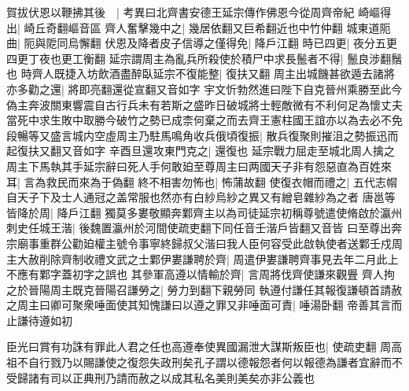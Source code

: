 賀拔伏恩以鞭拂其後　|{
	考異曰北齊書安德王延宗傳作佛恩今從周齊帝紀}
崎嶇得出|{
	崎丘奇翻嶇音區}
齊人奮擊幾中之|{
	幾居依翻又巨希翻近也中竹仲翻}
城東道阨曲|{
	阨與阸同烏懈翻}
伏恩及降者皮子信導之僅得免|{
	降戶江翻}
時已四更|{
	夜分五更四更丁夜也更工衡翻}
延宗謂周主為亂兵所殺使於積尸中求長鬛者不得|{
	鬛良涉翻鬚也}
時齊人既捷入坊飲酒盡醉臥延宗不復能整|{
	復扶又翻}
周主出城饑甚欲遁去諸將亦多勸之還|{
	將即亮翻還從宣翻又音如字}
宇文忻勃然進曰陛下自克晉州乘勝至此今偽主奔波關東響震自古行兵未有若斯之盛昨日破城將士輕敵微有不利何足為懷丈夫當死中求生敗中取勝今破竹之勢已成柰何棄之而去齊王憲柱國王誼亦以為去必不免段暢等又盛言城内空虛周主乃駐馬鳴角收兵俄頃復振|{
	散兵復聚則摧沮之勢振迅而起復扶又翻又音如字}
辛酉旦還攻東門克之|{
	還復也}
延宗戰力屈走至城北周人擒之周主下馬執其手延宗辭曰死人手何敢廹至尊周主曰两國天子非有怨惡直為百姓來耳|{
	言為救民而來為于偽翻}
終不相害勿怖也|{
	怖蒲故翻}
使復衣帽而禮之|{
	五代志㡌自天子下及士人通冠之盖常服也然亦有白紗烏紗之異又有繒皂雜紗為之者}
唐邕等皆降於周|{
	降戶江翻}
獨莫多婁敬顯奔鄴齊主以為司徒延宗初稱尊號遣使脩啟於瀛州刺史任城王湝|{
	後魏置瀛州於河間使疏吏翻下同任音壬湝戶皆翻又音皆}
曰至尊出奔宗廟事重群公勸廹權主號令事寧終歸叔父湝曰我人臣何容受此啟執使者送鄴壬戍周主大赦削除齊制收禮文武之士鄴伊婁謙聘於齊|{
	周遣伊婁謙聘齊事見去年二月此上不應有鄴字蓋初字之誤也}
其參軍高遵以情輸於齊|{
	言周將伐齊使謙來觀舋}
齊人拘之於晉陽周主既克晉陽召謙勞之|{
	勞力到翻下親勞同}
執遵付謙任其報復謙頓首請赦之周主曰卿可聚衆唾面使其知愧謙曰以遵之罪又非唾面可責|{
	唾湯卧翻}
帝善其言而止謙待遵如初

臣光曰賞有功誅有罪此人君之任也高遵奉使異國漏泄大謀斯叛臣也|{
	使疏吏翻}
周高祖不自行戮乃以賜謙使之復怨失政刑矣孔子謂以德報怨者何以報德為謙者宜辭而不受歸諸有司以正典刑乃請而赦之以成其私名美則美矣亦非公義也


